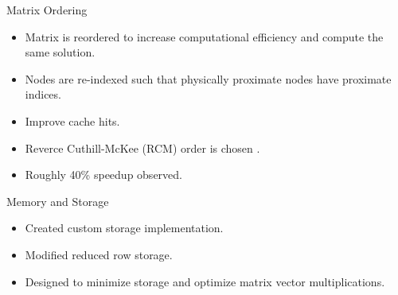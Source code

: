 \begin{frame}{Matrix Ordering}
  \begin{itemize}
    \item Matrix is reordered to increase computational efficiency and compute
      the same solution.
    \item Nodes are re-indexed such that physically proximate nodes have
      proximate indices.
    \item Improve cache hits.
    \item Reverce Cuthill-McKee (RCM) order is chosen \cite{rcm}.
    \item Roughly 40\% speedup observed.
  \end{itemize}
  \vspace{-0.25in}
  \begin{figure}
    \centering
    \hspace{0.1in}
    \label{fig:sparsity_pattern}
  \end{figure}
\end{frame}

\begin{frame}{Memory and Storage}
  \begin{itemize}
    \item Created custom \twotable storage implementation.
    \item Modified reduced row storage.
    \item Designed to minimize storage and optimize matrix vector
      multiplications.
  \end{itemize}
\end{frame}

